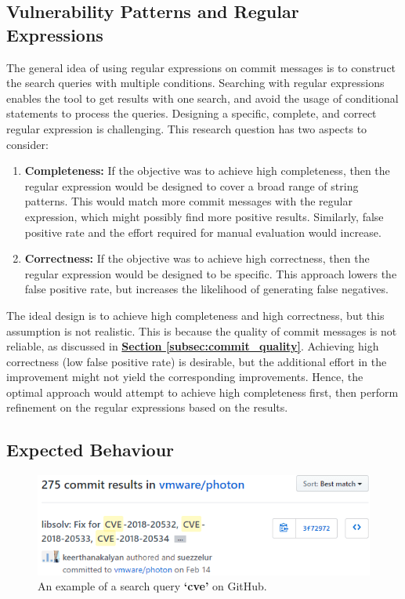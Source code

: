 \documentclass[12pt, a4paper]{report}
\begin{document}
\subsection{Vulnerability Patterns and Regular Expressions}
The general idea of using regular expressions on commit messages is to construct the search queries
with multiple conditions. Searching with regular expressions enables the tool to get results with
one search, and avoid the usage of conditional statements to process the queries. Designing a
specific, complete, and correct regular expression is challenging. This research question has two
aspects to consider:
\begin{enumerate}
  \item \textbf{Completeness:} If the objective was to achieve high completeness, then the regular
  expression would be designed to cover a broad range of string patterns. This would match more
  commit messages with the regular expression, which might possibly find more positive results.
  Similarly, false positive rate and the effort required for manual evaluation would increase.
  \item \textbf{Correctness:} If the objective was to achieve high correctness, then the regular
  expression would be designed to be specific. This approach lowers the false positive rate, but
  increases the likelihood of generating false negatives.
\end{enumerate}

The ideal design is to achieve high completeness and high correctness, but this assumption is not
realistic. This is because the quality of commit messages is not reliable, as discussed in
\hyperref[subsec:commit_quality]{\textbf{Section \ref{subsec:commit_quality}}}. Achieving high
correctness (low false positive rate) is desirable, but the additional effort in the improvement
might not yield the corresponding improvements. Hence, the optimal approach would attempt to achieve
high completeness first, then perform refinement on the regular expressions based on the results.

\subsection{Expected Behaviour}
\begin{figure}[H]
  \centering
  \includegraphics[width=.85\textwidth]{images/keyword_search.png}
  \caption{An example of a search query \textbf{`\acrshort{cve}'} on GitHub.}
  \label{figure:keyword_search}
\end{figure}
\end{document}
